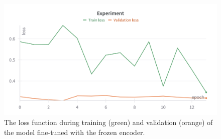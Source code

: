 \begin{figure}[H]
\begin{centering}
\includegraphics[width=\textwidth]{assets/images/for_presentation/exp4-loss.png}
\par\end{centering}
\caption{The loss function during training (green) and validation (orange) of the model fine-tuned with the frozen encoder.
\label{fig:exp4-loss}}
\end{figure}

